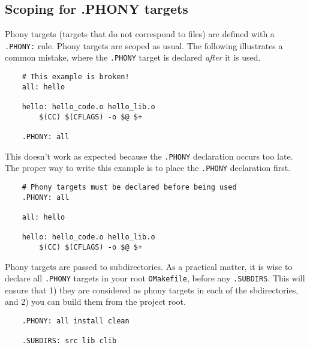 \subsection{Scoping for .PHONY targets}

Phony targets (targets that do not correspond to files) are defined with a \verb+.PHONY:+ rule.
Phony targets are scoped as usual.  The following illustrates a common mistake, where the
\verb+.PHONY+ target is declared \emph{after} it is used.

\begin{verbatim}
    # This example is broken!
    all: hello

    hello: hello_code.o hello_lib.o
        $(CC) $(CFLAGS) -o $@ $+

    .PHONY: all
\end{verbatim}

This doesn't work as expected because the \verb+.PHONY+ declaration occurs too late.  The proper way
to write this example is to place the \verb+.PHONY+ declaration first.

\begin{verbatim}
    # Phony targets must be declared before being used
    .PHONY: all

    all: hello

    hello: hello_code.o hello_lib.o
        $(CC) $(CFLAGS) -o $@ $+
\end{verbatim}

Phony targets are passed to subdirectories.  As a practical matter, it is wise to declare all
\verb+.PHONY+ targets in your root \verb+OMakefile+, before any \verb+.SUBDIRS+.  This will ensure
that 1) they are considered as phony targets in each of the sbdirectories, and 2) you can build them
from the project root.

\begin{verbatim}
    .PHONY: all install clean

    .SUBDIRS: src lib clib
\end{verbatim}

